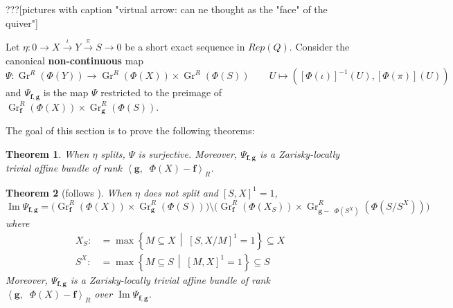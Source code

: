 \documentclass[reqno,11pt]{amsart}
\numberwithin{equation}{section}
\theoremstyle{plain}
\newtheorem{theorem}{Theorem}[section]
\theoremstyle{plain}
\numberwithin{equation}{section}
\theoremstyle{remark}
\DeclareMathOperator{\Img}{\operatorname{Im}}
\DeclareMathOperator{\dimv}{\operatorname{\underline{\mathbf{dim}}}}
\newcommand{\Grr}{\operatorname{Gr}^{R}}
\newcommand{\dimvec}[1]{\mathbf{#1}}
\begin{document}
???[pictures with caption "virtual arrow: can ne thought as the "face" of the quiver"]

Let $\eta: 0\longrightarrow X \stackrel{\iota}{\longrightarrow} Y \stackrel{\pi}{\longrightarrow} S \longrightarrow 0$ be a short exact sequence in $Rep(Q)$. Consider the canonical \textbf{non-continuous} map
$$\Psi: \Grr(\Phi(Y)) \longrightarrow \Grr(\Phi(X)) \times \Grr(\Phi(S)) \qquad U \longmapsto \left([\Phi(\iota)]^{-1}(U),[\Phi(\pi)](U)   \right)$$
and  $\Psi_{\dimvec{f},\dimvec{g}}$ is the map $\Psi$ restricted to the preimage of $\Grr_{\dimvec{f}}(\Phi(X)) \times \Grr_{\dimvec{g}}(\Phi(S))$.

The goal of this section is to prove the following theorems:
\begin{theorem}\label{thm:main1}
	When $\eta$ splits, $\Psi$ is surjective. Moreover, $\Psi_{\dimvec{f},\dimvec{g}}$ is a Zarisky-locally trivial affine bundle of rank $\left< \dimvec{g},\dimv \Phi(X) - \dimvec{f}\right>_R$.
\end{theorem}
\begin{theorem}[follows {\cite[Theorem 32]{irelli2019cell}}]\label{thm:main2}
	When $\eta$ does not split and $[S,X]^1=1$, 
	$$\Img \Psi_{\dimvec{f},\dimvec{g}} = \bigg(\Grr_{\dimvec{f}}(\Phi(X)) \times \Grr_{\dimvec{g}}(\Phi(S)) \bigg) \setminus \bigg(\Grr_{\dimvec{f}}(\Phi(X_S)) \times \Grr_{\dimvec{g}-\dimv \Phi(S^X)}\left(\Phi(S/S^X)\right) \bigg)$$
	where 
	\begin{equation*}
	\begin{aligned}
	X_S:&= \max \left\{ M \subseteq X \,\middle|\; [S,X/M ]^1=1 \right\} \subseteq X\\
	S^X:&= \max \left\{ M \subseteq S \,\middle|\; [M,X]^1=1 \right\} \subseteq S
	\end{aligned}
	\end{equation*}
Moreover, $\Psi_{\dimvec{f},\dimvec{g}}$ is a Zarisky-locally trivial affine bundle of rank $\left< \dimvec{g},\dimv \Phi(X) - \dimvec{f}\right>_R$ over $\Img \Psi_{\dimvec{f},\dimvec{g}}$.
\end{theorem}
\end{document}
